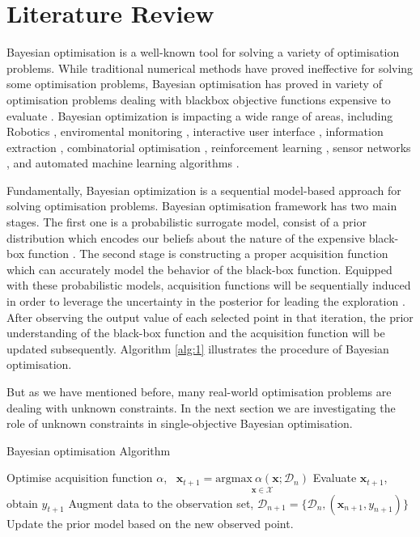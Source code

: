 \chapter{Literature Review}


Bayesian optimisation is a well-known tool for solving a variety of optimisation problems. While traditional numerical methods have proved ineffective for solving some optimisation problems, Bayesian optimisation has proved in variety of optimisation problems dealing with blackbox objective functions expensive to evaluate \cite{gelbart2014bayesian}. Bayesian optimization is impacting a wide range of areas, including Robotics \cite{lizotte2007automatic,martinez2007active}, enviromental monitoring \cite{marchant2012bayesian}, interactive user interface \cite{brochu2010bayesian}, information extraction \cite{wang2014bayesian}, combinatorial optimisation \cite{wang2013bayesian,hutter2011sequential}, reinforcement learning \cite{brochu2010tutorial}, sensor networks \cite{garnett2010bayesian,srinivas2009gaussian}, and automated machine learning algorithms \cite{thornton2013auto,snoek2012practical,hoffman2014correlation,garnett2013active}.
\par
Fundamentally, Bayesian optimization is a sequential model-based approach for solving optimisation problems. Bayesian optimisation framework has two main stages. The first one is a probabilistic surrogate model, consist of a prior distribution which encodes our beliefs about the nature of the expensive black-box function \cite{shahriari2016taking}. The second stage is constructing a proper acquisition function which can accurately model the behavior of the black-box function. Equipped with these probabilistic models, acquisition functions will be sequentially induced  in order to leverage the uncertainty in the posterior for leading the exploration \cite{shahriari2016taking}. After observing the output value of each selected point in that iteration, the prior understanding of the black-box function and the acquisition function will be updated subsequently. Algorithm \ref{alg:1} illustrates the procedure of Bayesian optimisation.
\par
But as we have mentioned before, many real-world optimisation problems are dealing with unknown constraints. In the next section we are investigating the role of unknown constraints in single-objective Bayesian optimisation.
\begin{algorithm}
  \caption{Bayesian optimisation Algorithm}\label{algo1}
  \begin{algorithmic}[1]
    \Require
	  \State Optimise acquisition function $\alpha$, \ 
	  $\textbf{x}_{t+1} = \underset{\textbf{x}   \in \mathcal{X}}{\mathrm{argmax}\ \alpha(\textbf{x};\mathcal{D}_n)}$
	  \State Evaluate $\textbf{x}_{t+1}$, obtain ${y}_{t+1}$
	  \State Augment data to the observation set, $\mathcal{D}_{n+1} = \{\mathcal{D}_n,(\textbf{x}_{n+1},{y}_{n+1})\}$
	  \State Update the prior model based on the new observed point.
	  \EndFor
  \end{algorithmic}
  \label{alg:1}
\end{algorithm}

